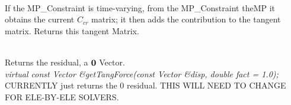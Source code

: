  \\
If the MP\_Constraint is time-varying, from the MP\_Constraint
\p theMP it obtains the current $C_{cr}$ matrix; it then adds the
contribution to the tangent matrix. Returns this tangent Matrix.

 \\
Returns the residual, a ${\bf 0}$ Vector. \\

{\em virtual const Vector \&getTangForce(const Vector \&disp, double
fact = 1.0);    }\\
CURRENTLY just returns the $0$ residual. THIS WILL NEED TO CHANGE FOR
ELE-BY-ELE SOLVERS. 


